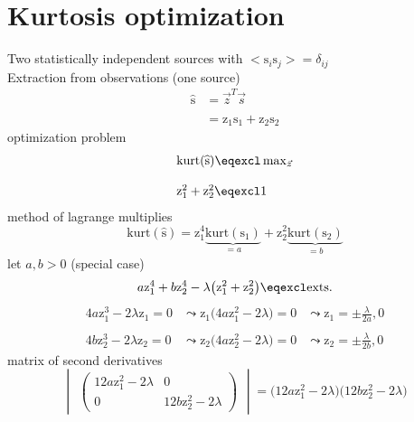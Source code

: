 \documentclass[a4paper,11pt]{article}
\begin{document}
\section{Kurtosis optimization}
Two statistically independent sources with $\big< \mathrm{s}_i \mathrm{s}_j \big> = \delta_{ij}$\\
Extraction from observations (one source)
\begin{equation}
	\begin{array}{ll}
	\widehat{\mathrm{s}} & = \vec{z}^T \vec{s}  \\\\
	& = \mathrm{z}_1 \mathrm{s}_1 + \mathrm{z}_2 \mathrm{s}_2
	\end{array}
\end{equation}
optimization problem
\begin{equation}
	\begin{array}{l}
	\mathrm{kurt}(\widehat{\mathrm{s}}) \eqexcl \max_{\vec{z}} \\\\
	\mathrm{z}^2_1 + \mathrm{z}^2_2 \eqexcl 1
	\end{array}
\end{equation}
method of lagrange multiplies
\begin{equation}
	\mathrm{kurt}(\widehat{\mathrm{s}}) = \mathrm{z}^4_1 
		\underbrace{\mathrm{kurt}(\mathrm{s}_1)}_{= a}
		+ \mathrm{z}^2_2 \underbrace{\mathrm{kurt}(\mathrm{s}_2)}_{
			= b}
\end{equation}
let $a, b > 0$ (special case)
\begin{equation}
	a\mathrm{z}^4_1 + b\mathrm{z}^4_2 - \lambda \big(\mathrm{z}^2_1 
		+ \mathrm{z}^2_2\big) \eqexcl \mathrm{exts.} 
\end{equation}
\begin{equation}
	\begin{array}{lll}
	4a\mathrm{z}^3_1 - 2\lambda\mathrm{z}_1 = 0
		& \leadsto \mathrm{z}_1 \big(4a\mathrm{z}^2_1 - 2\lambda
			\big) = 0
		& \leadsto \mathrm{z}_1 = \pm \frac{\lambda}{2a}, 0 \\\\
	4b\mathrm{z}^3_2 - 2\lambda\mathrm{z}_2 = 0
		& \leadsto \mathrm{z}_2 \big(4a\mathrm{z}^2_2 - 2\lambda
			\big) = 0
		& \leadsto \mathrm{z}_2 = \pm \frac{\lambda}{2b}, 0
	\end{array}
\end{equation}
matrix of second derivatives
\begin{equation}
	\begin{vmatrix} \begin{pmatrix} 
		12a\mathrm{z}^2_1 - 2\lambda & 0 \\
		0 & 12b\mathrm{z}^2_2 - 2\lambda
	\end{pmatrix} \end{vmatrix}
	= \big(12a\mathrm{z}^2_1 - 2\lambda\big)
		\big(12b\mathrm{z}^2_2 - 2\lambda\big)
\end{equation}
\end{document}
